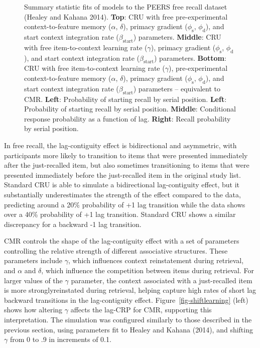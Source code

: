 \documentclass[
  letterpaper,
  DIV=11,
  numbers=noendperiod]{scrartcl}
\begin{document}
\begin{figure}
\caption{\label{fig-fitlagcrp}Summary statistic fits of models to the
PEERS free recall dataset (Healey and Kahana 2014). \textbf{Top}: CRU
with free pre-experimental context-to-feature memory (\(\alpha\),
\(\delta\)), primacy gradient (\(\phi_\text{s}\), \(\phi_\text{d}\)),
and start context integration rate (\(\beta_\text{start}\)) parameters.
\textbf{Middle}: CRU with free item-to-context learning rate
(\(\gamma\)), primacy gradient (\(\phi_\text{s}\), \(\phi_\text{d}\)),
and start context integration rate (\(\beta_\text{start}\)) parameters.
\textbf{Bottom}: CRU with free item-to-context learning rate
(\(\gamma\)), pre-experimental context-to-feature memory (\(\alpha\),
\(\delta\)), primacy gradient (\(\phi_\text{s}\), \(\phi_\text{d}\)),
and start context integration rate (\(\beta_\text{start}\)) parameters
-- equivalent to CMR. \textbf{Left}: Probability of starting recall by
serial position. \textbf{Left}: Probability of starting recall by serial
position. \textbf{Middle}: Conditional response probability as a
function of lag. \textbf{Right}: Recall probability by serial position.}

\end{figure}%

In free recall, the lag-contiguity effect is bidirectional and
asymmetric, with participants more likely to transition to items that
were presented immediately after the just-recalled item, but also
sometimes transitioning to items that were presented immediately before
the just-recalled item in the original study list. Standard CRU is able
to simulate a bidirectional lag-contiguity effect, but it substantially
underestimates the strength of the effect compared to the data,
predicting around a 20\% probability of +1 lag transition while the data
shows over a 40\% probability of +1 lag transition. Standard CRU shows a
similar discrepancy for a backward -1 lag transition.

CMR controls the shape of the lag-contiguity effect with a set of
parameters controlling the relative strength of different associative
structures. These parameters include \(\gamma\), which influences
context reinstatement during retrieval, and \(\alpha\) and \(\delta\),
which influence the competition between items during retrieval. For
larger values of the \(\gamma\) parameter, the context associated with a
just-recalled item is more stronglyreinstated during retrieval, helping
capture high rates of short lag backward transitions in the
lag-contiguity effect. Figure~\ref{fig-shiftlearning} (left) shows how
altering \(\gamma\) affects the lag-CRP for CMR, supporting this
interpretation. The simulation was configured similarly to those
described in the previous section, using parameters fit to Healey and
Kahana (2014), and shifting \(\gamma\) from 0 to .9 in increments of
0.1.
\end{document}
